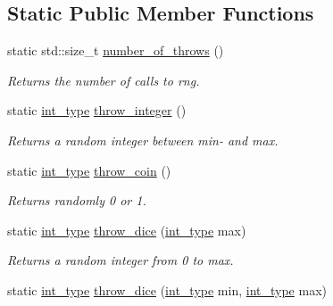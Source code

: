 \subsection*{Static Public Member Functions}
\begin{DoxyCompactItemize}
\item 
\hypertarget{a00471_aea964b4b9f7a0c33cec784099bdabad3}{}static std\+::size\+\_\+t \hyperlink{a00471_aea964b4b9f7a0c33cec784099bdabad3}{number\+\_\+of\+\_\+throws} ()\label{a00471_aea964b4b9f7a0c33cec784099bdabad3}

\begin{DoxyCompactList}\small\item\em Returns the number of calls to rng. \end{DoxyCompactList}\item 
\hypertarget{a00471_a25a21df7cddd17508448cb9fce5b324e}{}static \hyperlink{a00471_aaea501ae2db60d08b10b98b3cf499f37}{int\+\_\+type} \hyperlink{a00471_a25a21df7cddd17508448cb9fce5b324e}{throw\+\_\+integer} ()\label{a00471_a25a21df7cddd17508448cb9fce5b324e}

\begin{DoxyCompactList}\small\item\em Returns a random integer between min-\/ and max. \end{DoxyCompactList}\item 
\hypertarget{a00471_ad871ac7b41171f96c1fc9da41dddce2f}{}static \hyperlink{a00471_aaea501ae2db60d08b10b98b3cf499f37}{int\+\_\+type} \hyperlink{a00471_ad871ac7b41171f96c1fc9da41dddce2f}{throw\+\_\+coin} ()\label{a00471_ad871ac7b41171f96c1fc9da41dddce2f}

\begin{DoxyCompactList}\small\item\em Returns randomly 0 or 1. \end{DoxyCompactList}\item 
\hypertarget{a00471_ac2697129e9250c4bbba19f710a516a46}{}static \hyperlink{a00471_aaea501ae2db60d08b10b98b3cf499f37}{int\+\_\+type} \hyperlink{a00471_ac2697129e9250c4bbba19f710a516a46}{throw\+\_\+dice} (\hyperlink{a00471_aaea501ae2db60d08b10b98b3cf499f37}{int\+\_\+type} max)\label{a00471_ac2697129e9250c4bbba19f710a516a46}

\begin{DoxyCompactList}\small\item\em Returns a random integer from 0 to max. \end{DoxyCompactList}\item 
\hypertarget{a00471_a2dacb6aab559df22441ff8878a738445}{}static \hyperlink{a00471_aaea501ae2db60d08b10b98b3cf499f37}{int\+\_\+type} \hyperlink{a00471_a2dacb6aab559df22441ff8878a738445}{throw\+\_\+dice} (\hyperlink{a00471_aaea501ae2db60d08b10b98b3cf499f37}{int\+\_\+type} min, \hyperlink{a00471_aaea501ae2db60d08b10b98b3cf499f37}{int\+\_\+type} max)\label{a00471_a2dacb6aab559df22441ff8878a738445}


\end{DoxyCompactItemize}
